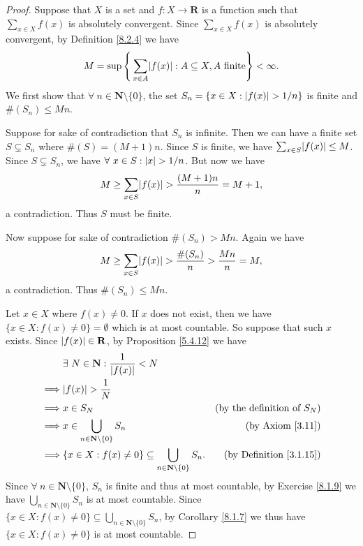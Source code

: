 \begin{proof}
    Suppose that \(X\) is a set and \(f : X \to \mathbf{R}\) is a function such that \(\sum_{x \in X} f(x)\) is absolutely convergent.
    Since \(\sum_{x \in X} f(x)\) is absolutely convergent, by Definition \ref{8.2.4} we have
    \[
        M = \sup\Bigg\{\sum_{x \in A} \abs*{f(x)} : A \subseteq X, A \text{ finite}\Bigg\} < \infty.
    \]
    We first show that \(\forall\ n \in \mathbf{N} \setminus \{0\}\), the set \(S_n = \{x \in X : \abs*{f(x)} > 1 / n\}\) is finite and \(\#(S_n) \leq Mn\).

    Suppose for sake of contradiction that \(S_n\) is infinite.
    Then we can have a finite set \(S \subsetneq S_n\) where \(\#(S) = (M + 1)n\).
    Since \(S\) is finite, we have \(\sum_{x \in S} \abs*{f(x)} \leq M\).
    Since \(S \subsetneq S_n\), we have \(\forall\ x \in S : \abs*{x} > 1 / n\).
    But now we have
    \[
        M \geq \sum_{x \in S} \abs*{f(x)} > \frac{(M + 1)n}{n} = M + 1,
    \]
    a contradiction.
    Thus \(S\) must be finite.

    Now suppose for sake of contradiction \(\#(S_n) > Mn\).
    Again we have
    \[
        M \geq \sum_{x \in S} \abs*{f(x)} > \frac{\#(S_n)}{n} > \frac{Mn}{n} = M,
    \]
    a contradiction.
    Thus \(\#(S_n) \leq Mn\).

    Let \(x \in X\) where \(f(x) \neq 0\).
    If \(x\) does not exist, then we have \(\{x \in X : f(x) \neq 0\} = \emptyset\) which is at most countable.
    So suppose that such \(x\) exists.
    Since \(\abs*{f(x)} \in \mathbf{R}\), by Proposition \ref{5.4.12} we have
    \begin{align*}
                 & \exists\ N \in \mathbf{N} : \frac{1}{\abs*{f(x)}} < N                                                                       \\
        \implies & \abs*{f(x)} > \frac{1}{N}                                                                                                   \\
        \implies & x \in S_N                                                                           & \text{(by the definition of \(S_N\))} \\
        \implies & x \in \bigcup_{n \in \mathbf{N} \setminus \{0\}} S_n                                & \text{(by Axiom \ref{3.11})}          \\
        \implies & \{x \in X : f(x) \neq 0\} \subseteq \bigcup_{n \in \mathbf{N} \setminus \{0\}} S_n. & \text{(by Definition \ref{3.1.15})}
    \end{align*}
    Since \(\forall\ n \in \mathbf{N} \setminus \{0\}\), \(S_n\) is finite and thus at most countable, by Exercise \ref{8.1.9} we have \(\bigcup_{n \in \mathbf{N} \setminus \{0\}} S_n\) is at most countable.
    Since \(\{x \in X : f(x) \neq 0\} \subseteq \bigcup_{n \in \mathbf{N} \setminus \{0\}} S_n\), by Corollary \ref{8.1.7} we thus have \(\{x \in X : f(x) \neq 0\}\) is at most countable.
\end{proof}

